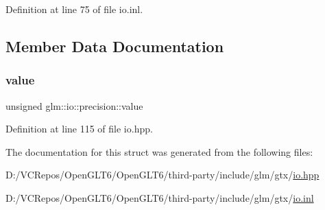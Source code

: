 Definition at line 75 of file io.\+inl.



\subsection{Member Data Documentation}
\mbox{\label{structglm_1_1io_1_1precision_a43da772dff9a209768c63f1220d52074}} 
\subsubsection{\texorpdfstring{value}{value}}
{\footnotesize\ttfamily unsigned glm\+::io\+::precision\+::value}



Definition at line 115 of file io.\+hpp.



The documentation for this struct was generated from the following files\+:\begin{DoxyCompactItemize}
\item 
D\+:/\+V\+C\+Repos/\+Open\+G\+L\+T6/\+Open\+G\+L\+T6/third-\/party/include/glm/gtx/\mbox{\hyperlink{io_8hpp}{io.\+hpp}}\item 
D\+:/\+V\+C\+Repos/\+Open\+G\+L\+T6/\+Open\+G\+L\+T6/third-\/party/include/glm/gtx/\mbox{\hyperlink{io_8inl}{io.\+inl}}\end{DoxyCompactItemize}
